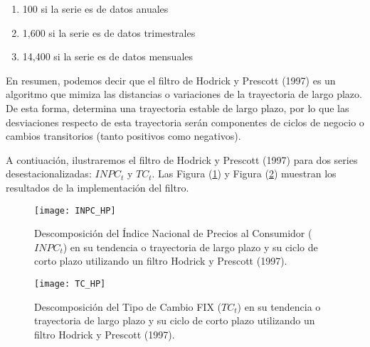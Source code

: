 \documentclass[
  a4paper,
]{article}
\providecommand{\tightlist}{%
  \setlength{\itemsep}{0pt}\setlength{\parskip}{0pt}}\usepackage{longtable,booktabs,array}
\begin{document}
\begin{enumerate}
\def\labelenumi{\arabic{enumi}.}
\tightlist
\item
  100 si la serie es de datos anuales
\item
  1,600 si la serie es de datos trimestrales
\item
  14,400 si la serie es de datos mensuales
\end{enumerate}

En resumen, podemos decir que el filtro de Hodrick y Prescott (1997) es
un algoritmo que mimiza las distancias o variaciones de la trayectoria
de largo plazo. De esta forma, determina una trayectoria estable de
largo plazo, por lo que las desviaciones respecto de esta trayectoria
serán componentes de ciclos de negocio o cambios transitorios (tanto
positivos como negativos).

A contiuación, ilustraremos el filtro de Hodrick y Prescott (1997) para
dos series desestacionalizadas: \(INPC_t\) y \(TC_t\). Las Figura
(\ref{INPC_HP}) y Figura (\ref{TC_HP}) muestran los resultados de la
implementación del filtro.

\begin{figure}
  \centering
    \texttt{[image: INPC\_HP]}
  \caption{Descomposición del Índice Nacional de Precios al Consumidor ($INPC_t$) en su tendencia o trayectoria de largo plazo y su ciclo de corto plazo utilizando un filtro Hodrick y Prescott (1997).}
  \label{INPC_HP}
\end{figure}

\begin{figure}
  \centering
    \texttt{[image: TC\_HP]}
  \caption{Descomposición del Tipo de Cambio FIX ($TC_t$) en su tendencia o trayectoria de largo plazo y su ciclo de corto plazo utilizando un filtro Hodrick y Prescott (1997).}
  \label{TC_HP}
\end{figure}


\printbibliography
\end{document}
